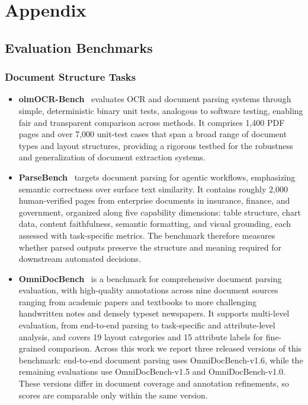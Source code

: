 \section{Appendix}

\subsection{Evaluation Benchmarks}

\subsubsection*{Document Structure Tasks}

\begin{itemize}[
  leftmargin=1.0em,
  labelsep=0.5em
]
    \item \textbf{olmOCR-Bench}~\cite{poznanski2025olmocr} evaluates OCR and document parsing systems through simple, deterministic binary unit tests, analogous to software testing, enabling fair and transparent comparison across methods. It comprises 1,400 PDF pages and over 7,000 unit-test cases that span a broad range of document types and layout structures, providing a rigorous testbed for the robustness and generalization of document extraction systems.

    \item \textbf{ParseBench}~\cite{zhang2026parsebenchdocumentparsingbenchmark} targets document parsing for agentic workflows, emphasizing semantic correctness over surface text similarity. It contains roughly 2,000 human-verified pages from enterprise documents in insurance, finance, and government, organized along five capability dimensions: table structure, chart data, content faithfulness, semantic formatting, and visual grounding, each assessed with task-specific metrics. The benchmark therefore measures whether parsed outputs preserve the structure and meaning required for downstream automated decisions.

    \item \textbf{OmniDocBench}~\cite{ouyang2025omnidocbench} is a benchmark for comprehensive document parsing evaluation, with high-quality annotations across nine document sources ranging from academic papers and textbooks to more challenging handwritten notes and densely typeset newspapers. It supports multi-level evaluation, from end-to-end parsing to task-specific and attribute-level analysis, and covers 19 layout categories and 15 attribute labels for fine-grained comparison. Across this work we report three released versions of this benchmark: end-to-end document parsing uses OmniDocBench-v1.6, while the remaining evaluations use OmniDocBench-v1.5 and OmniDocBench-v1.0. These versions differ in document coverage and annotation refinements, so scores are comparable only within the same version.


\end{itemize}
